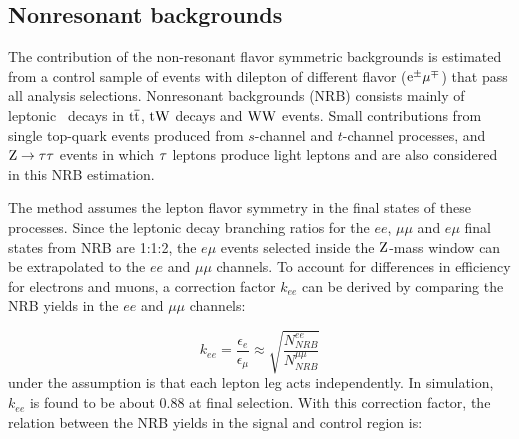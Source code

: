
\subsection{Nonresonant backgrounds}
\label{ss:dm_nrb}
The contribution of the non-resonant flavor symmetric backgrounds is  estimated from a control
sample of events with dilepton of different flavor
($\mathrm{e}^{\pm}\mathrm{\mu}^{\mp}$) that pass all analysis selections.
Nonresonant backgrounds (NRB) consists mainly of leptonic \PW\ decays in
${\mathrm{t}\overline{\mathrm{t}}}$, $\mathrm{t}\mathrm{W}$ decays and 
$\mathrm{W}\mathrm{W}$ events. Small contributions from single top-quark events produced from
$s$-channel and $t$-channel processes, and $\mathrm{Z}\rightarrow \mathrm{\tau}\mathrm{\tau}$
events in which $\mathrm{\tau}$ leptons produce light leptons and \ETm are also
considered in this NRB estimation. 

The method assumes the lepton flavor symmetry in the final states of these processes.
Since the leptonic decay branching ratios for the $ee$, $\mu\mu$ and $e\mu$ final states from NRB are 1:1:2,
the $e\mu$ events selected inside the $\mathrm{Z}$-mass window can be extrapolated to the $ee$ and $\mu\mu$ channels.
To account for differences in efficiency for electrons and muons, a correction factor $k_{ee}$ can be derived
by comparing the NRB yields in the $ee$ and $\mu\mu$ channels:

\begin{equation}
\label{eq:kee}
k_{ee} = \frac{\epsilon_e}{\epsilon_{\mu}} \approx \sqrt{\frac{N^{ee}_{NRB}}{N^{\mu\mu}_{NRB}}}
\end{equation}
under the assumption is that each lepton leg acts independently.
In simulation, $k_{ee}$ is found to be about $0.88$ at final selection.
With this correction factor, the relation between the NRB yields in the signal and control region is:

